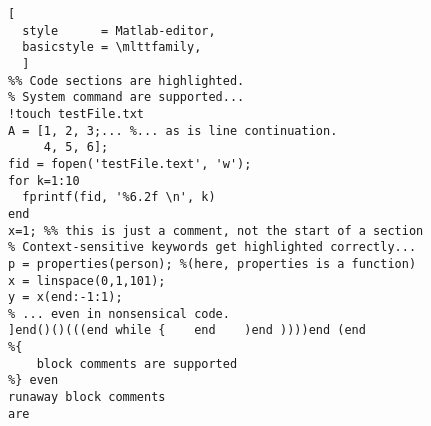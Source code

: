 \UseRawInputEncoding
\begin{lstlisting}[
  style      = Matlab-editor,
  basicstyle = \mlttfamily,
  ]
%% Code sections are highlighted.
% System command are supported...
!touch testFile.txt
A = [1, 2, 3;... %... as is line continuation.
     4, 5, 6];
fid = fopen('testFile.text', 'w');
for k=1:10
  fprintf(fid, '%6.2f \n', k)
end
x=1; %% this is just a comment, not the start of a section
% Context-sensitive keywords get highlighted correctly...
p = properties(person); %(here, properties is a function)
x = linspace(0,1,101);
y = x(end:-1:1);
% ... even in nonsensical code.
]end()()(((end while {    end    )end ))))end (end
%{
    block comments are supported
%} even
runaway block comments
are
\end{lstlisting}

%